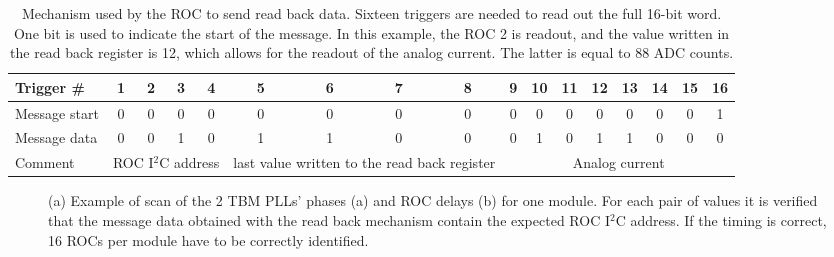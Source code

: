 \begin{table}[!htb]
  \caption{Mechanism used by the ROC to send read back data. Sixteen triggers are needed to read out the full 16-bit word. One bit is used to indicate the start of the message.
  In this example, the ROC 2 is readout, and the value written in the read back register is 12, which allows for the readout of the analog current. The latter is equal to 88 ADC counts.}
  \centering
  \begin{tabular}{|l|*{16}{c|}}
    \hline
    Trigger \#        & 1 & 2 & 3 & 4 & 5 & 6 & 7 & 8 & 9 & 10 & 11 & 12 & 13 & 14 & 15 & 16\\
    \hline
    Message start & 0 & 0 & 0 & 0 & 0 & 0 & 0 & 0 & 0 & 0   & 0  & 0   & 0   & 0   & 0   & 1\\
    \hline
    Message data & 0 & 0 & 1 & 0 & 1 & 1 & 0 & 0 & 0 & 1   & 0  & 1   & 1   & 0   & 0   & 0\\
    \hline
    Comment        & \multicolumn{4}{p{2cm}|}{\footnotesize ROC I$^2$C address} & \multicolumn{4}{p{2cm}|}{\footnotesize last value written to the read back register} & \multicolumn{8}{p{4cm}|}{\footnotesize Analog current}\\

    \hline    
  \end{tabular}
  \label{tab:ReadBack}
\end{table}

\begin{figure}[!htb]
 \begin{center}
 \end{center}
 \caption{(a) Example of scan of the 2 TBM PLLs' phases (a) and ROC delays (b) for one module. For each pair of values it is verified that the message data obtained with the read back mechanism contain the expected ROC I$^2$C address. If the timing is correct, 16 ROCs per module have to be correctly identified.}
 \label{fig:TBMROCdelaysRB}
\end{figure} 

